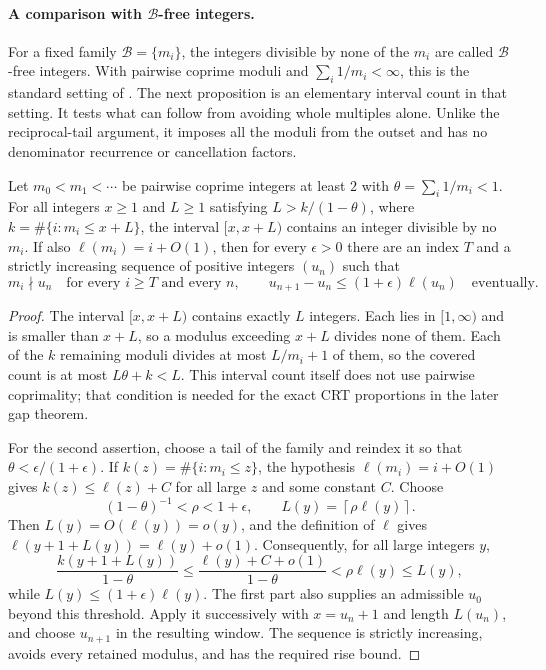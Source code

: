\paragraph{A comparison with $\mathcal B$-free integers.}
For a fixed family $\mathcal B=\{m_i\}$, the integers divisible by none
of the $m_i$ are called $\mathcal B$-free integers. With pairwise coprime
moduli and $\sum_i1/m_i<\infty$, this is the standard setting of
\cite[\S1.2]{elabdalaoui2015}. The next proposition is an elementary
interval count in that setting. It tests what can follow from avoiding
whole multiples alone. Unlike the reciprocal-tail argument, it imposes
all the moduli from the outset and has no denominator recurrence or
cancellation factors.

\begin{proposition}\label{long243:res:coprimalitycap}
Let $m_0<m_1<\cdots$ be pairwise coprime integers at least $2$ with
$\theta=\sum_i1/m_i<1$. For all integers $x\ge1$ and $L\ge1$ satisfying
$L>k/(1-\theta)$, where $k=\#\{i:m_i\le x+L\}$, the interval $[x,x+L)$ contains
an integer divisible by no $m_i$. If also $\ell(m_i)=i+O(1)$, then for
every $\epsilon>0$ there are an index $T$ and a strictly increasing
sequence of positive integers $(u_n)$ such that
\[
 m_i\nmid u_n\quad\text{for every }i\ge T\text{ and every }n,
 \qquad
 u_{n+1}-u_n\le(1+\epsilon)\ell(u_n)\quad\text{eventually}.
\]
\end{proposition}

\begin{proof}
The interval $[x,x+L)$ contains exactly $L$ integers.  Each lies in
$[1,\infty)$ and is smaller than $x+L$, so a
modulus exceeding $x+L$ divides none of them. Each of the $k$ remaining
moduli divides at most $L/m_i+1$ of them, so the covered count is at most
$L\theta+k<L$. This interval count itself does not use pairwise
coprimality; that condition is needed for the exact CRT proportions
in the later gap theorem.

For the second assertion, choose a tail of the family and reindex it so that
$\theta<\epsilon/(1+\epsilon)$.  If
$k(z)=\#\{i:m_i\le z\}$, the hypothesis $\ell(m_i)=i+O(1)$ gives
$k(z)\le\ell(z)+C$ for all large $z$ and some constant $C$.  Choose
\[
 (1-\theta)^{-1}<\rho<1+\epsilon,
 \qquad L(y)=\left\lceil\rho\ell(y)\right\rceil .
\]
Then $L(y)=O(\ell(y))=o(y)$, and the definition of $\ell$ gives
$\ell(y+1+L(y))=\ell(y)+o(1)$.  Consequently, for all large integers $y$,
\[
 \frac{k(y+1+L(y))}{1-\theta}
 \le \frac{\ell(y)+C+o(1)}{1-\theta}
 < \rho\ell(y)\le L(y),
\]
while $L(y)\le(1+\epsilon)\ell(y)$.  The first part also supplies an admissible $u_0$ beyond this threshold.
Apply it successively with $x=u_n+1$ and length $L(u_n)$, and choose
$u_{n+1}$ in the resulting window.  The sequence is strictly increasing,
avoids every retained modulus, and has the required rise bound.
\end{proof}

